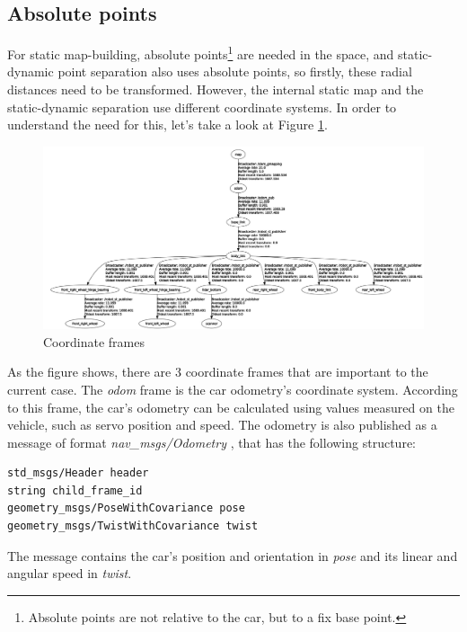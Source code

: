 \subsection{Absolute points}
\label{chap:absolute_points}
For static map-building, absolute points\footnote{Absolute points are not relative to the car, but to a fix base point.} are needed in the space, and static-dynamic point separation also uses absolute points, so firstly, these radial distances need to be transformed. However, the internal static map and the static-dynamic separation use different coordinate systems. In order to understand the need for this, let's take a look at Figure \ref{rqt_input}.

\begin{figure}[!ht]
    \centering
    \includegraphics[width=\textwidth]{figures/raw/jpeg/rqt_input.jpg}
    \caption{Coordinate frames}
    \label{rqt_input}
\end{figure}

As the figure shows, there are 3 coordinate frames that are important to the current case. The \textit{odom} frame is the car odometry's coordinate system. According to this frame, the car's odometry can be calculated using values measured on the vehicle, such as servo position and speed. The odometry is also published as a message of format \textit{nav\_msgs/Odometry} \cite{ros_msg_Odometry}, that has the following structure:

\begin{minipage}{\textwidth}
\begin{lstlisting}[language=IDL]
std_msgs/Header header
string child_frame_id
geometry_msgs/PoseWithCovariance pose
geometry_msgs/TwistWithCovariance twist
\end{lstlisting}
\end{minipage}

The message contains the car's position and orientation in \textit{pose} and its linear and angular speed in \textit{twist}.

